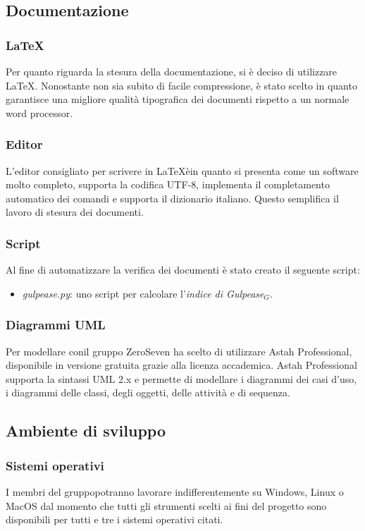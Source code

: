 \subsection{Documentazione}
\subsubsection{\LaTeX}
Per quanto riguarda la stesura della documentazione, si è deciso di utilizzare \LaTeX. Nonostante non sia subito di facile compressione, è stato scelto in quanto garantisce una migliore qualità tipografica dei documenti rispetto a un normale word processor.
\subsubsection{Editor}
 L'editor consigliato per scrivere in \LaTeX èin quanto si presenta come un software molto completo, supporta la codifica UTF-8, implementa il completamento automatico dei comandi e supporta il dizionario italiano. Questo semplifica il lavoro di stesura dei documenti.
 \subsubsection{Script}
Al fine di automatizzare la verifica dei documenti è stato creato il seguente script:
\begin{itemize}
	\item \textit{gulpease.py}: uno script per calcolare l'\textit{indice di Gulpease$_{G}$}.
\end{itemize} 
\subsubsection{Diagrammi UML}
Per modellare conil gruppo ZeroSeven ha scelto di utilizzare Astah Professional, disponibile in versione gratuita grazie alla licenza accademica. Astah Professional supporta la sintassi UML 2.x e permette di modellare i diagrammi dei casi d'uso, i diagrammi delle classi, degli oggetti, delle attività e di sequenza. 
\subsection{Ambiente di sviluppo}
\subsubsection{Sistemi operativi}
I membri del gruppopotranno lavorare indifferentemente su Windows, Linux o MacOS dal momento che tutti gli strumenti scelti ai fini del progetto sono disponibili per tutti e tre i sistemi operativi citati. 

